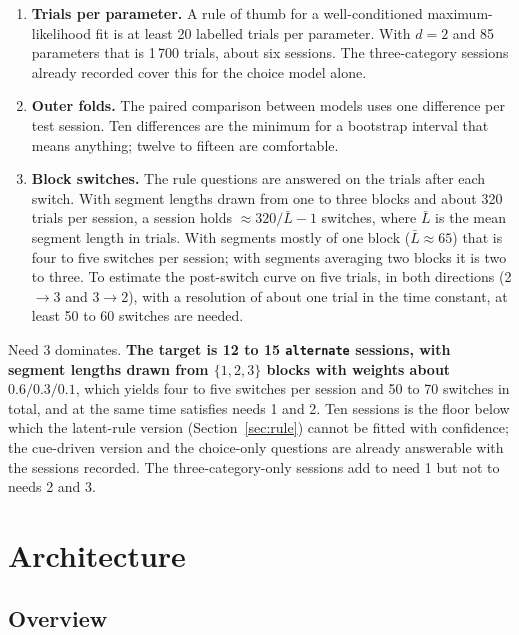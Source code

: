\documentclass[11pt,a4paper]{article}
\begin{document}
\begin{enumerate}[leftmargin=*]
\item \textbf{Trials per parameter.} A rule of thumb for a well-conditioned
      maximum-likelihood fit is at least 20 labelled trials per parameter. With
      $d = 2$ and 85 parameters that is 1\,700 trials, about six sessions. The
      three-category sessions already recorded cover this for the choice model alone.
\item \textbf{Outer folds.} The paired comparison between models uses one difference
      per test session. Ten differences are the minimum for a bootstrap interval that
      means anything; twelve to fifteen are comfortable.
\item \textbf{Block switches.} The rule questions are answered on the trials after
      each switch. With segment lengths drawn from one to three blocks and about 320
      trials per session, a session holds
      $\approx 320 / \bar{L} - 1$ switches, where $\bar{L}$ is the mean segment length
      in trials. With segments mostly of one block ($\bar{L} \approx 65$) that is four
      to five switches per session; with segments averaging two blocks it is two to
      three. To estimate the post-switch curve on five trials, in both directions
      (2$\to$3 and 3$\to$2), with a resolution of about one trial in the time
      constant, at least 50 to 60 switches are needed.
\end{enumerate}

Need 3 dominates. \textbf{The target is 12 to 15 \texttt{alternate} sessions, with
segment lengths drawn from $\{1, 2, 3\}$ blocks with weights about $0.6/0.3/0.1$},
which yields four to five switches per session and 50 to 70 switches in total, and at the
same time satisfies needs 1 and 2. Ten sessions is the floor below which the latent-rule
version (Section~\ref{sec:rule}) cannot be fitted with confidence; the cue-driven
version and the choice-only questions are already answerable with the sessions recorded.
The three-category-only sessions add to need 1 but not to needs 2 and 3.

\section{Architecture}
\label{sec:arch}

\subsection{Overview}
\end{document}

